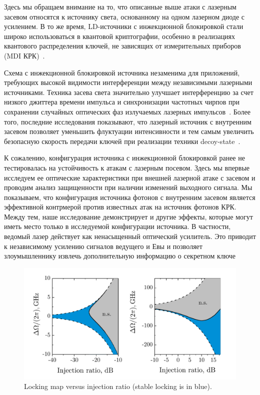 Здесь мы обращаем внимание на то, что описанные выше атаки с лазерным засевом относятся к источнику света, основанному на одном лазерном диоде с усилением. В то же время, LD-источники с инжекционной блокировкой стали широко использоваться в квантовой криптографии, особенно в реализациях квантового распределения ключей, не зависящих от измерительных приборов (MDI КРК)~\cite{wei2020,woodward2021}.

Схема с инжекционной блокировкой источника незаменима для приложений, требующих высокой видимости интерференции между независимыми лазерными источниками. Техника засева света значительно улучшает интерференцию за счет низкого джиттера времени импульса и синхронизации частотных чирпов при сохранении случайных оптических фаз излучаемых лазерных импульсов~\cite{comandar2016a}. Более того, последние исследования показывают, что лазерный источник с внутренним засевом позволяет уменьшить флуктуации интенсивности и тем самым увеличить безопасную скорость передачи ключей при реализации техники decoy-state~\cite{xie2019}. %
 
К сожалению, конфигурация источника с инжекционной блокировкой ранее не тестировалась на устойчивость к атакам с лазерным посевом. Здесь мы впервые исследуем ее оптические характеристики при внешней лазерной атаке с засевом и проводим анализ защищенности при наличии изменений выходного сигнала. Мы показываем, что конфигурация источника фотонов с внутренним засевом является эффективной контрмерой против известных атак на источник фотонов КРК. Между тем, наше исследование демонстрирует и другие эффекты, которые могут иметь место только в исследуемой конфигурации источника. В частности, ведомый лазер действует как ненасыщенный оптический усилитель. Это приводит к независимому усилению сигналов ведущего и Евы и позволяет злоумышленнику извлечь дополнительную информацию о секретном ключе
\begin{figure}
\includegraphics{images/StabilityDiagramsFreq.pdf}
\caption{Locking map versus injection ratio (stable locking is in blue).}
\label{fig:injection_stab ch5}
\end{figure}
